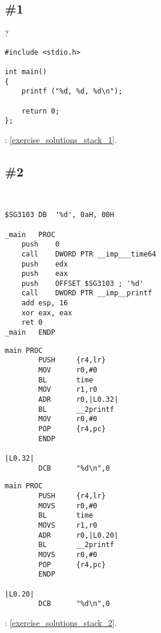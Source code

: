 ﻿\section{\Exercises}

\subsection{\Exercise \#1}
\label{exercise_stack_1}

?

\begin{lstlisting}
#include <stdio.h>

int main()
{
	printf ("%d, %d, %d\n");

	return 0;
};
\end{lstlisting}

\Answer{}: \ref{exercise_solutions_stack_1}.

\subsection{\Exercise \#2}
\label{exercise_stack_2}

\WhatThisCodeDoes\

\begin{lstlisting}[caption=MSVC 2010 /Ox]
$SG3103	DB	'%d', 0aH, 00H

_main	PROC
	push	0
	call	DWORD PTR __imp___time64
	push	edx
	push	eax
	push	OFFSET $SG3103 ; '%d'
	call	DWORD PTR __imp__printf
	add	esp, 16
	xor	eax, eax
	ret	0
_main	ENDP
\end{lstlisting}

\begin{lstlisting}[caption=\Optimizing Keil 5.03 (\ARMMode)]
main PROC
        PUSH     {r4,lr}
        MOV      r0,#0
        BL       time
        MOV      r1,r0
        ADR      r0,|L0.32|
        BL       __2printf
        MOV      r0,#0
        POP      {r4,pc}
        ENDP

|L0.32|
        DCB      "%d\n",0
\end{lstlisting}

\begin{lstlisting}[caption=\Optimizing Keil 5.03 (\ThumbMode)]
main PROC
        PUSH     {r4,lr}
        MOVS     r0,#0
        BL       time
        MOVS     r1,r0
        ADR      r0,|L0.20|
        BL       __2printf
        MOVS     r0,#0
        POP      {r4,pc}
        ENDP

|L0.20|
        DCB      "%d\n",0
\end{lstlisting}

\Answer{}: \ref{exercise_solutions_stack_2}.

